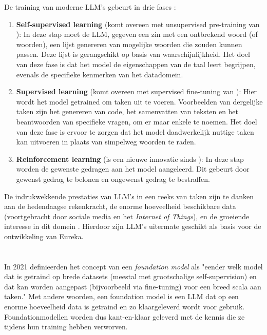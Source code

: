 De training van moderne \acrshort{LLM}'s gebeurt in drie fases \autocite{Bach2024}:
\begin{enumerate} 
    \item \textbf{Self-supervised learning} (komt overeen met unsupervised pre-training van \textcite{Radford2018}): In deze stap moet de LLM, gegeven een zin met een ontbrekend woord (of woorden), een lijst genereren van mogelijke woorden die zouden kunnen passen. Deze lijst is gerangschikt op basis van waarschijnlijkheid. Het doel van deze fase is dat het model de eigenschappen van de taal leert begrijpen, evenals de specifieke kenmerken van het datadomein.
    \item \textbf{Supervised learning} (komt overeen met supervised fine-tuning van \textcite{Radford2018}): Hier wordt het model getrained om taken uit te voeren. Voorbeelden van dergelijke taken zijn het genereren van code, het samenvatten van teksten en het beantwoorden van specifieke vragen, om er maar enkele te noemen. Het doel van deze fase is ervoor te zorgen dat het model daadwerkelijk nuttige taken kan uitvoeren in plaats van simpelweg woorden te raden.
    \item \textbf{Reinforcement learning} (is een nieuwe innovatie sinds \textcite{Radford2018}): In deze stap worden de gewenste gedragen aan het model aangeleerd. Dit gebeurt door gewenst gedrag te belonen en ongewenst gedrag te bestraffen.
\end{enumerate}

De indrukwekkende prestaties van \acrshort{LLM}'s in een reeks van taken \autocite{Naveed2023} zijn te danken aan de hedendaagse rekenkracht, de enorme hoeveelheid beschikbare data (voortgebracht door sociale media en het \textit{Internet of Things}), en de groeiende interesse in dit domein \autocite{Zohuri2022, Naveed2023}. Hierdoor zijn \acrshort{LLM}'s uitermate geschikt als basis voor de ontwikkeling van Eureka. 

\section{}%
\label{sec:ontwerp}

\subsection{}%
\label{subsec:specialiseren_llm}

In 2021 definieerden \textcite{Bommasani2021} het concept van een \textit{foundation model} als "eender welk model dat is getraind op brede datasets (meestal met grootschalige self-supervision) en dat kan worden aangepast (bijvoorbeeld via fine-tuning) voor een breed scala aan taken." Met andere woorden, een foundation model is een \acrshort{LLM} dat op een enorme hoeveelheid data is getraind en zo klaargeleverd wordt voor gebruik. Foundationmodellen worden dus kant-en-klaar geleverd met de kennis die ze tijdens hun training hebben verworven.

